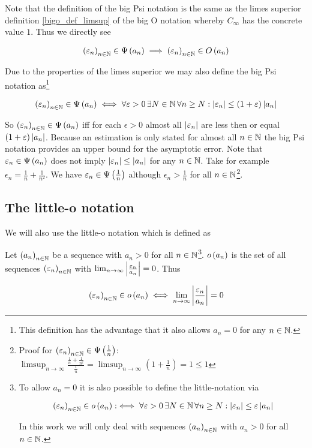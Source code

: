 Note that the definition of the big Psi notation is the same as the limes superior definition \eqref{bigo_def_limsup} of the big O notation whereby $C_\infty$ has the concrete value $1$. Thus we directly see

\begin{align}
  \left({\varepsilon_n}\right)_{{n}\in\mathbb N} \in \Psi\left( {a_n} \right) \implies \left({\varepsilon_n}\right)_{{n}\in\mathbb N} \in O\left( {a_n} \right)
\end{align}

\noindent Due to the properties of the limes superior we may also define the big Psi notation as\footnote{This definition has the advantage that it also allows $a_n=0$ for any $n\in\mathbb N$.}


\begin{align}
  \left({\varepsilon_n}\right)_{{n}\in\mathbb N} \in \Psi\left( {a_n} \right) \iff \forall \varepsilon > 0\, \exists N \in \mathbb N\, \forall n\ge N: \left|{\varepsilon_n}\right| \le (1+\varepsilon)\left|{a_n}\right|
\end{align}

So $\left({\varepsilon_n}\right)_{{n}\in\mathbb N}\in\Psi\left( {a_n} \right)$ iff for each $\epsilon > 0$ almost all $\left|{\varepsilon_n}\right|$ are less then or equal $(1+\varepsilon)\left|{a_n}\right|$. Because an estimation is only stated for almost all $n\in\mathbb N$ the big Psi notation provides an upper bound for the asymptotic error. Note that $\varepsilon_n\in\Psi\left( {a_n} \right)$ does not imply $\left|{\varepsilon_n}\right|\le\left|{a_n}\right|$ for any $n\in\mathbb N$. Take for example $\epsilon_n = \frac 1n + \frac 1{n^2}$. We have $\varepsilon_n \in \Psi\left( {\frac 1n} \right)$ although $\epsilon_n > \frac 1n$ for all $n\in\mathbb N$\footnote{Proof for $\left({\varepsilon_n}\right)_{{n}\in\mathbb N} \in \Psi\left( {\frac 1n} \right)$: $\limsup_{n\to\infty} \frac{\frac 1n + \frac 1{n^2}}{\frac 1n} = \limsup_{n\to\infty} \left(1+\frac 1n\right) = 1 \le 1$}.

\subsection{The little-o notation}

We will also use the little-o notation which is defined as~\cite[pp.~99,~103]{aigner}\cite[p.~385]{hachenberger}\cite{wiki:bigo}

\begin{definition}
  Let $\left({a_n}\right)_{{n}\in\mathbb N}$ be a sequence with $a_n > 0$ for all $n\in\mathbb N$\footnote{To allow $a_n=0$ it is also possible to define the little-notation via~\cite[pp.~448]{graham}\cite{wiki:bigo}

  \begin{align}
    \left({\varepsilon_n}\right)_{{n}\in\mathbb N}\in o\left( {a_n} \right) :\iff \forall \varepsilon > 0\, \exists N\in\mathbb N\, \forall n \ge N: \left|{\varepsilon_n}\right| \le \varepsilon \left|{a_n}\right|
  \end{align}

  \noindent In this work we will only deal with sequences $\left({a_n}\right)_{{n}\in\mathbb N}$ with $a_n > 0$ for all $n\in\mathbb N$.
}. $o\left( {a_n} \right)$ is the set of all sequences $\left({\varepsilon_n}\right)_{{n}\in\mathbb N}$ with $\lim_{n\to\infty} \left|{\frac{\varepsilon_n}{a_n}}\right| = 0$. Thus

  \begin{align}
    \left({\varepsilon_n}\right)_{{n}\in\mathbb N}\in o\left( {a_n} \right) \iff \lim_{n\to\infty} \left|{\frac{\varepsilon_n}{a_n}}\right| = 0
  \end{align}
\end{definition}

